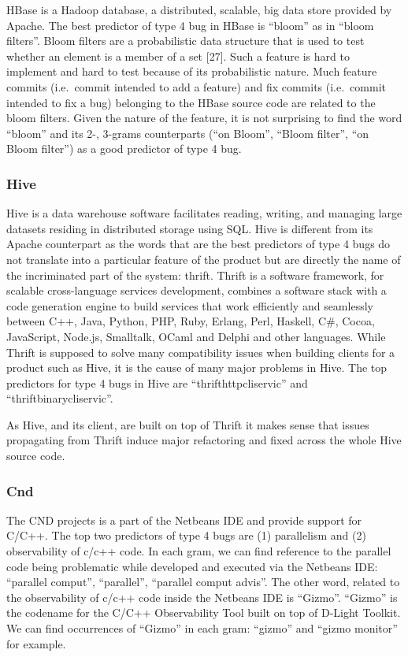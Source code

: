 \documentclass[12pt]{report}
\begin{document}
HBase is a Hadoop database, a distributed, scalable, big data store
provided by Apache. The best predictor of type 4 bug in HBase is
``bloom'' as in ``bloom filters''. Bloom filters are a probabilistic
data structure that is used to test whether an element is a member of a
set {[}27{]}. Such a feature is hard to implement and hard to test
because of its probabilistic nature. Much feature commits (i.e.~commit
intended to add a feature) and fix commits (i.e.~commit intended to fix
a bug) belonging to the HBase source code are related to the bloom
filters. Given the nature of the feature, it is not surprising to find
the word ``bloom'' and its 2-, 3-grams counterparts (``on Bloom'',
``Bloom filter'', ``on Bloom filter'') as a good predictor of type 4
bug.

\subsubsection{Hive}\label{hive}

Hive is a data warehouse software facilitates reading, writing, and
managing large datasets residing in distributed storage using SQL. Hive
is different from its Apache counterpart as the words that are the best
predictors of type 4 bugs do not translate into a particular feature of
the product but are directly the name of the incriminated part of the
system: thrift. Thrift is a software framework, for scalable
cross-language services development, combines a software stack with a
code generation engine to build services that work efficiently and
seamlessly between C++, Java, Python, PHP, Ruby, Erlang, Perl, Haskell,
C\#, Cocoa, JavaScript, Node.js, Smalltalk, OCaml and Delphi and other
languages. While Thrift is supposed to solve many compatibility issues
when building clients for a product such as Hive, it is the cause of
many major problems in Hive. The top predictors for type 4 bugs in Hive
are ``thrifthttpcliservic'' and ``thriftbinarycliservic''.

As Hive, and its client, are built on top of Thrift it makes sense that
issues propagating from Thrift induce major refactoring and fixed across
the whole Hive source code.

\subsubsection{Cnd}\label{cnd}

The CND projects is a part of the Netbeans IDE and provide support for
C/C++. The top two predictors of type 4 bugs are (1) parallelism and (2)
observability of c/c++ code. In each gram, we can find reference to the
parallel code being problematic while developed and executed via the
Netbeans IDE: ``parallel comput'', ``parallel'', ``parallel comput
advis''. The other word, related to the observability of c/c++ code
inside the Netbeans IDE is ``Gizmo''. ``Gizmo'' is the codename for the
C/C++ Observability Tool built on top of D-Light Toolkit. We can find
occurrences of ``Gizmo'' in each gram: ``gizmo'' and ``gizmo monitor''
for example.
\end{document}
